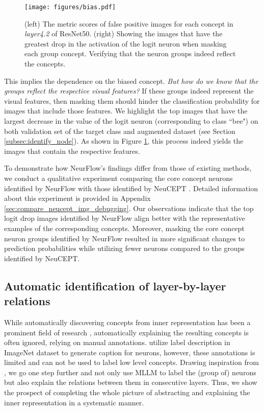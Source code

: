\begin{figure}
\begin{center}
\vspace{-12mm}
\texttt{[image: figures/bias.pdf]} 
\end{center}
\vspace{-3mm}
\caption{(left) The metric scores of false positive images for each concept in \textit{layer4.2} of ResNet50. (right) Showing the images that have the greatest drop in the activation of the logit neuron when masking each group concept. Verifying that the neuron groups indeed reflect the concepts.} \label{fig:debias}
\vspace{-15pt}
\end{figure}
This implies the dependence on the biased concept. \textit{But how do we know that the groups reflect the respective visual features?} If these groups indeed represent the visual features, then masking them should hinder the classification probability for images that include those features. We highlight the top images that have the largest decrease in the value of the logit neuron (corresponding to class ``bee") on both validation set of the target class and augmented dataset (see Section \ref{subsec:identify_node}). As shown in Figure \ref{fig:debias}, this process indeed yields the images that contain the respective features.

To demonstrate how NeurFlow's findings differ from those of existing methods, we conduct a qualitative experiment comparing the core concept neurons identified by NeurFlow with those identified by NeuCEPT \citet{NEUCEPT}. Detailed information about this experiment is provided in Appendix \ref{sec:compare_neucept_img_debugging}. Our observations indicate that 
the top logit drop images identified by NeurFlow align better with the representative examples of the corresponding concepts. Moreover, masking the core concept neuron groups identified by NeurFlow resulted in more significant changes to prediction probabilities while utilizing fewer neurons compared to the groups identified by NeuCEPT.


\subsection{Automatic identification of layer-by-layer relations}
\label{labeling}
\vspace{-5pt}
While automatically discovering concepts from inner representation has been a prominent field of research \citep{CRAFT}, automatically explaining the resulting concepts is often ignored, relying on manual annotations. \citet{Invert} utilize label description in ImageNet dataset to generate caption for neurons, however, these annotations is limited and can not be used to label low level concepts. Drawing inspiration from \citet{hoang2024llm, falcon}, we go one step further and not only use MLLM to label the (group of) neurons but also explain the relations between them in consecutive layers. Thus, we show the prospect of completing the whole picture of abstracting and explaining the inner representation in a systematic manner. 

